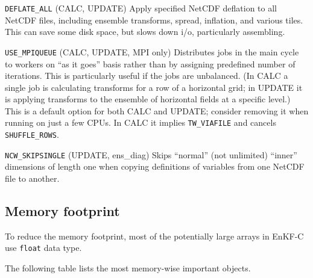 \documentclass[11pt]{report}
\begin{document}
\begin{description}
\item{\verb|DEFLATE_ALL|} (CALC, UPDATE)
  Apply specified NetCDF deflation to all NetCDF files, including ensemble transforms, spread, inflation, and various tiles.
  This can save some disk space, but slows down i/o, particularly assembling.
\item{\verb|USE_MPIQUEUE|} (CALC, UPDATE, MPI only)
  Distributes jobs in the main cycle to workers on ``as it goes'' basis rather than by assigning predefined number of iterations.
  This is particularly useful if the jobs are unbalanced.
  (In CALC a single job is calculating transforms for a row of a horizontal grid; in UPDATE it is applying transforms to the ensemble of horizontal fields at a specific level.)
  This is a default option for both CALC and UPDATE; consider removing it when running on just a few CPUs.
  In CALC it implies \verb|TW_VIAFILE| and cancels \verb|SHUFFLE_ROWS|.
\item{\verb|NCW_SKIPSINGLE|} (UPDATE, ens\_diag)
  Skips ``normal'' (not unlimited) ``inner'' dimensions of length one when copying definitions of variables from one NetCDF file to another.
\end{description}

\subsection{Memory footprint}
\label{sec:memory}

To reduce the memory footprint, most of the potentially large arrays in EnKF-C use \verb|float| data type.

The following table lists the most memory-wise important objects.
\end{document}
